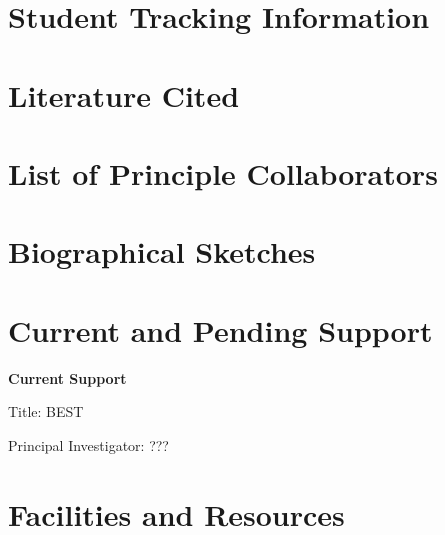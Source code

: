\documentclass{DOEproposal}
\begin{document}
	
	\section{Student Tracking Information}
        \label{sec:staffing}
        
    \newpage




	\newpage 
    \section{Literature Cited} 
	{%
		\label{sec:references}
        
	}
    \newpage

	\section{List of Principle Collaborators}
        \label{sec:PC}
        
    \newpage

 
	
	\section{Biographical Sketches}
        \label{sec:biosketches}
        
    
	\newpage 
	\section{Current and Pending Support}
        \label{sec:grants}
	
	{\bf Current Support}

	\noindent
	Title: BEST
	
	\noindent
	Principal Investigator: ???  


	\newpage 
	\section{Facilities and Resources}
        \label{sec:facres}
	
\end{document}
